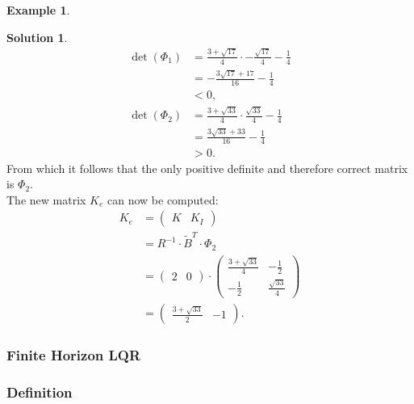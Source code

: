 \documentclass[a4paper,12 pt]{article}
\numberwithin{equation}{section}
\theoremstyle{definition}
\newtheorem{bsp}{Example}
\theoremstyle{remark}
\theoremstyle{definition}
\newtheorem*{lsg}{Solution}
\theoremstyle{definition}
\theoremstyle{definition}
\theoremstyle{remark}
\begin{document}
\begin{bsp}
\begin{lsg}
\begin{equation*}
\begin{split}
\det(\Phi_1)&= \frac{3+\sqrt{17}}{4}\cdot -\frac{\sqrt{17}}{4} -\frac{1}{4}\\
&=-\frac{3\sqrt{17}+17}{16}-\frac{1}{4}\\
&<0,\\
\det(\Phi_2)&= \frac{3+\sqrt{33}}{4}\cdot \frac{\sqrt{33}}{4}  -\frac{1}{4}\\
&=\frac{3\sqrt{33}+33}{16}-\frac{1}{4}\\
&>0.
\end{split}
\end{equation*}
From which it follows that the only positive definite and therefore correct matrix is $\Phi_2$.\\
The new matrix $K_e$ can now be computed:
\begin{equation*}
\begin{split}
K_e&=\begin{pmatrix} K & K_I \end{pmatrix}\\
&=R^{-1}\cdot \tilde{B}^T \cdot \Phi_2 \\
&= \begin{pmatrix} 2&0\end{pmatrix} \cdot \begin{pmatrix}
\frac{3+\sqrt{33}}{4}&-\frac{1}{2} \\[6pt]
-\frac{1}{2}&\frac{\sqrt{33}}{4}
\end{pmatrix}\\
&= \begin{pmatrix} \frac{3+\sqrt{33}}{2}& -1 \end{pmatrix}.
\end{split}
\end{equation*}

\end{lsg}

\end{bsp}
\newpage
\subsubsection{Finite Horizon LQR}
\subsubsection*{Definition}
\end{document}
